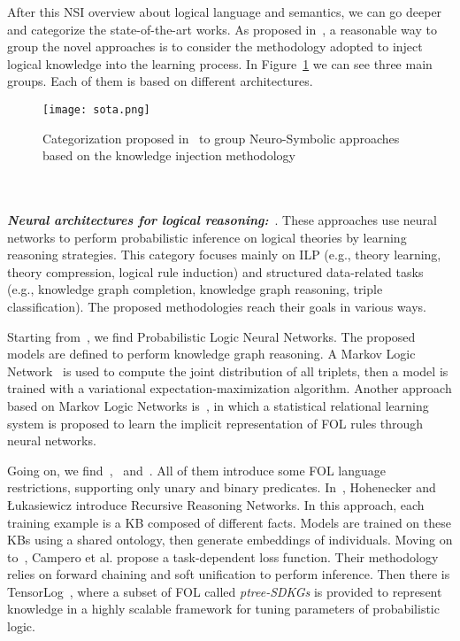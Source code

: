 After this NSI overview about logical language and semantics, we can go deeper and categorize the state-of-the-art works. As proposed in~\cite{ltn}, a reasonable way to group the novel approaches is to consider the methodology adopted to inject logical knowledge into the learning process. In Figure~\ref{fig:sota} we can see three main groups. Each of them is based on different architectures.
\begin{figure}
    \centerline{\texttt{[image: sota.png]}}
    \caption{Categorization proposed in~\cite{ltn} to group Neuro-Symbolic approaches based on the knowledge injection methodology}
    \label{fig:sota}
\end{figure}
\\\\
\textit{\textbf{Neural architectures for logical reasoning:}}~\cite{tensorlog,cohen2020scalable,conditionalTheoremProvers,campero2018logical,neuralMarkovLogicNetworks,probabilisticLogicNeuralNetworks,recursiveReasoningNetworks,deepProlog,satnet,nlrl}. These approaches use neural networks to perform probabilistic inference on logical theories by learning reasoning strategies. This category focuses mainly on ILP (e.g., theory learning, theory compression, logical rule induction) and structured data-related tasks (e.g., knowledge graph completion, knowledge graph reasoning, triple classification). The proposed methodologies reach their goals in various ways.

Starting from~\cite{probabilisticLogicNeuralNetworks}, we find Probabilistic Logic Neural Networks. The proposed models are defined to perform knowledge graph reasoning. A Markov Logic Network~\cite{markovLogicNetworks} is used to compute the joint distribution of all triplets, then a model is trained with a variational expectation-maximization algorithm. Another approach based on Markov Logic Networks is~\cite{neuralMarkovLogicNetworks}, in which a statistical relational learning system is proposed to learn the implicit representation of FOL rules through neural networks.

Going on, we find~\cite{recursiveReasoningNetworks},~\cite{campero2018logical} and~\cite{tensorlog}. All of them introduce some FOL language restrictions, supporting only unary and binary predicates. In~\cite{recursiveReasoningNetworks}, Hohenecker and Łukasiewicz introduce Recursive Reasoning Networks. In this approach, each training example is a KB composed of different facts. Models are trained on these KBs using a shared ontology, then generate embeddings of individuals. Moving on to~\cite{campero2018logical}, Campero et al. propose a task-dependent loss function. Their methodology relies on forward chaining and soft unification to perform inference. Then there is TensorLog~\cite{tensorlog}, where a subset of FOL called \textit{ptree-SDKGs} is provided to represent knowledge in a highly scalable framework for tuning parameters of probabilistic logic. 

